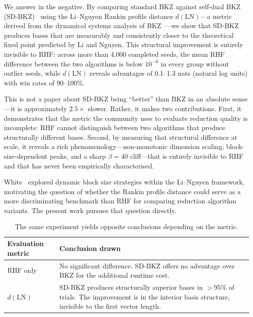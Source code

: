 \documentclass[journal=cic,version=preprint]{iacrj}
\begin{document}
We answer in the negative. By comparing standard BKZ against self-dual BKZ (SD-BKZ)~\cite{EC:MicWal16} using the Li--Nguyen Rankin profile distance $d(\mathrm{LN})$---a metric derived from the dynamical systems analysis of BKZ~\cite{EPRINT:LiNgu20}---we show that SD-BKZ produces bases that are measurably and consistently closer to the theoretical fixed point predicted by Li and Nguyen. This structural improvement is entirely invisible to RHF: across more than 4{,}000 completed seeds, the mean RHF difference between the two algorithms is below $10^{-6}$ in every group without outlier seeds, while $d(\mathrm{LN})$ reveals advantages of 0.1--1.3 nats (natural log units) with win rates of 90--100\%.

This is not a paper about SD-BKZ being ``better'' than BKZ in an absolute sense---it is approximately $2.5\times$ slower. Rather, it makes two contributions. First, it demonstrates that the metric the community uses to evaluate reduction quality is incomplete: RHF cannot distinguish between two algorithms that produce structurally different bases. Second, by measuring that structural difference at scale, it reveals a rich phenomenology---non-monotonic dimension scaling, block-size-dependent peaks, and a sharp $\beta=40$ cliff---that is entirely invisible to RHF and that has never been empirically characterised.

White~\cite{White26} explored dynamic block size strategies within the Li--Nguyen framework, motivating the question of whether the Rankin profile distance could serve as a more discriminating benchmark than RHF for comparing reduction algorithm variants. The present work pursues that question directly.

\begin{table}[tbp]
\centering
\caption{The same experiment yields opposite conclusions depending on the metric.\label{tab:metric-split}}
\begin{tabular}{p{3.2cm}p{8.5cm}}
\hline
\textbf{Evaluation metric} & \textbf{Conclusion drawn} \\
\hline
RHF only & No significant difference. SD-BKZ offers no advantage over BKZ for the additional runtime cost. \\
$d(\mathrm{LN})$ & SD-BKZ produces structurally superior bases in $>95\%$ of trials. The improvement is in the interior basis structure, invisible to the first vector length. \\
\hline
\end{tabular}
\end{table}
\end{document}
